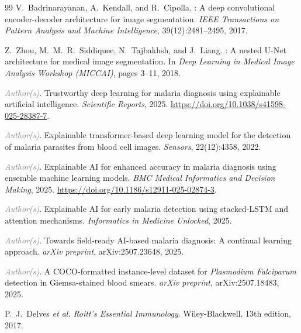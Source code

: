 \documentclass[10pt,twocolumn]{article}
\newcommand{\etal}{\textit{et al.}}
\newcommand{\placeholder}[1]{\textcolor{gray}{\textit{#1}}}
\begin{document}
\begin{thebibliography}{99}
V.~Badrinarayanan, A.~Kendall, and R.~Cipolla.
: A deep convolutional encoder-decoder architecture for
  image segmentation.
\newblock \textit{IEEE Transactions on Pattern Analysis and Machine
  Intelligence}, 39(12):2481--2495, 2017.

Z.~Zhou, M.~M.~R.~Siddiquee, N.~Tajbakhsh, and J.~Liang.
: A nested {U-Net} architecture for medical image
  segmentation.
\newblock In \textit{Deep Learning in Medical Image Analysis Workshop
  (MICCAI)}, pages 3--11, 2018.

\placeholder{Author(s)}.
\newblock Trustworthy deep learning for malaria diagnosis using explainable
  artificial intelligence.
\newblock \textit{Scientific Reports}, 2025.
\newblock \url{https://doi.org/10.1038/s41598-025-28387-7}.

\placeholder{Author(s)}.
\newblock Explainable transformer-based deep learning model for the detection
  of malaria parasites from blood cell images.
\newblock \textit{Sensors}, 22(12):4358, 2022.

\placeholder{Author(s)}.
\newblock Explainable {AI} for enhanced accuracy in malaria diagnosis using
  ensemble machine learning models.
\newblock \textit{BMC Medical Informatics and Decision Making}, 2025.
\newblock \url{https://doi.org/10.1186/s12911-025-02874-3}.

\placeholder{Author(s)}.
\newblock Explainable {AI} for early malaria detection using stacked-{LSTM}
  and attention mechanisms.
\newblock \textit{Informatics in Medicine Unlocked}, 2025.

\placeholder{Author(s)}.
\newblock Towards field-ready {AI}-based malaria diagnosis: A continual
  learning approach.
\newblock \textit{arXiv preprint}, arXiv:2507.23648, 2025.

\placeholder{Author(s)}.
\newblock A {COCO}-formatted instance-level dataset for
  \textit{Plasmodium Falciparum} detection in {Giemsa}-stained blood smears.
\newblock \textit{arXiv preprint}, arXiv:2507.18483, 2025.

P.~J.~Delves \etal
\newblock \textit{Roitt's Essential Immunology}.
\newblock Wiley-Blackwell, 13th edition, 2017.

\end{thebibliography}
\end{document}
